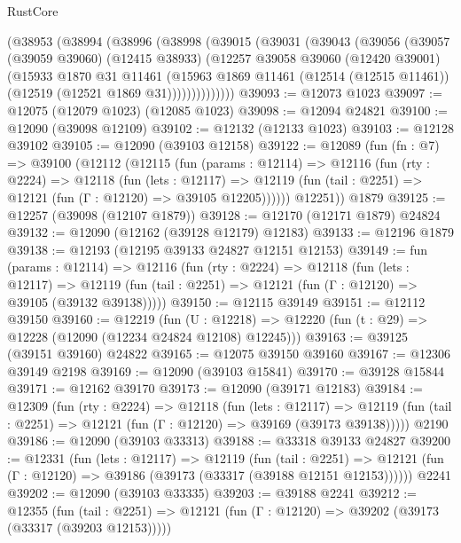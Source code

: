 \begin{lexlean}{RustCore}
\begin{coremodule}
    (@38953
      (@38994
        (@38996
          (@38998
            (@39015
              (@39031
                (@39043
                  (@39056
                    (@39057
                      (@39059 @39060)
                      (@12415 @38933)
                      (@12257
                        @39058
                        @39060
                        (@12420 @39001)
                        (@15933
                          @1870
                          @31
                          @11461
                          (@15963
                            @1869
                            @11461
                            (@12514 (@12515 @11461))
                            (@12519 (@12521 @1869 @31))))))))))))))
@39093 := @12073 @1023
@39097 := @12075 (@12079 @1023) (@12085 @1023)
@39098 := @12094 @24821
@39100 := @12090 (@39098 @12109)
@39102 := @12132 (@12133 @1023)
@39103 := @12128 @39102
@39105 := @12090 (@39103 @12158)
@39122 := @12089
    (fun (fn : @7) =>
    @39100
      (@12112
        (@12115
          (fun (params : @12114) =>
          @12116
            (fun (rty : @2224) =>
            @12118
              (fun (lets : @12117) =>
              @12119 (fun (tail : @2251) => @12121 (fun (Γ : @12120) => @39105 @12205))))))
        @12251))
    @1879
@39125 := @12257 (@39098 (@12107 @1879))
@39128 := @12170 (@12171 @1879) @24824
@39132 := @12090 (@12162 (@39128 @12179) @12183)
@39133 := @12196 @1879
@39138 := @12193 (@12195 @39133 @24827 @12151 @12153)
@39149 := fun (params : @12114) =>
  @12116
    (fun (rty : @2224) =>
    @12118
      (fun (lets : @12117) =>
      @12119 (fun (tail : @2251) => @12121 (fun (Γ : @12120) => @39105 (@39132 @39138)))))
@39150 := @12115 @39149
@39151 := @12112 @39150
@39160 := @12219
    (fun (U : @12218) => @12220 (fun (t : @29) => @12228 (@12090 (@12234 @24824 @12108) @12245)))
@39163 := @39125 (@39151 @39160) @24822
@39165 := @12075 @39150 @39160
@39167 := @12306 @39149 @2198
@39169 := @12090 (@39103 @15841)
@39170 := @39128 @15844
@39171 := @12162 @39170
@39173 := @12090 (@39171 @12183)
@39184 := @12309
    (fun (rty : @2224) =>
    @12118
      (fun (lets : @12117) =>
      @12119 (fun (tail : @2251) => @12121 (fun (Γ : @12120) => @39169 (@39173 @39138)))))
    @2190
@39186 := @12090 (@39103 @33313)
@39188 := @33318 @39133 @24827
@39200 := @12331
    (fun (lets : @12117) =>
    @12119
      (fun (tail : @2251) =>
      @12121 (fun (Γ : @12120) => @39186 (@39173 (@33317 (@39188 @12151 @12153))))))
    @2241
@39202 := @12090 (@39103 @33335)
@39203 := @39188 @2241
@39212 := @12355
    (fun (tail : @2251) => @12121 (fun (Γ : @12120) => @39202 (@39173 (@33317 (@39203 @12153)))))

\end{coremodule}
\end{lexlean}
